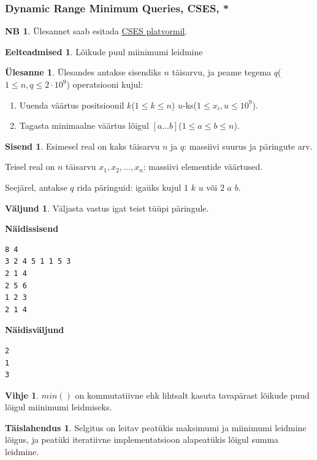 \documentclass{trkut}
\theoremstyle{definition}
\newtheorem*{prereq}{Eelteadmised}
\newtheorem*{extra}{NB}
\newtheorem*{vihje}{Vihje}
\newtheorem*{solution}{Täislahendus}
\newtheorem*{Input}{Sisend}
\newtheorem*{Output}{Väljund}
\newtheorem*{Text}{Ülesanne}
\begin{document}
\subsubsection{Dynamic Range Minimum Queries, CSES, *} 
\begin{extra}
Ülesannet saab esitada \href{https://cses.fi/problemset/task/1649}{CSES platvormil}.
\end{extra}
\begin{prereq}
Lõikude puul miinimumi leidmine
\end{prereq}
\begin{Text}
Ülesandes antakse sisendiks $n$ täisarvu, ja peame tegema $q$($1\le n,q\le 2\cdot10^9$) operatsiooni kujul: 
\begin{enumerate}
    \item Uuenda väärtus positsioonil $k$($1\le k\le n$) $u$-ks($1\le x_i,u\le 10^9$).
    \item Tagasta minimaalne väärtus lõigul $[a...b]$($1\le a\le b\le n$).
\end{enumerate}

\parencite{min}
\end{Text}
\begin{Input}
 Esimesel real on kaks täisarvu $n$ ja $q$: massiivi suurus ja päringute arv.

 Teisel real on $n$ täisarvu $x_1,x_2,...,x_n$: massiivi elementide väärtused.

 Seejärel, antakse $q$ rida päringuid: igaüks kujul $1$ $k$ $u$ või $2$ $a$ $b$.
\end{Input}

\begin{Output}
Väljasta vastus igat teist tüüpi päringule.
\end{Output}

\textbf{Näidissisend
}
\begin{verbatim}
8 4
3 2 4 5 1 1 5 3
2 1 4
2 5 6
1 2 3
2 1 4
\end{verbatim}

\textbf{Näidisväljund}

\begin{verbatim}
2
1
3
\end{verbatim}



\begin{vihje}
$min()$ on kommutatiivne ehk lihtsalt kasuta tavapärast lõikude puud lõigul miinimumi leidmiseks.
\end{vihje}
\begin{solution}
Selgitus on leitav peatükis maksimumi ja miinimumi leidmine lõigus, ja peatüki iteratiivne implementatsioon alapeatükis lõigul summa leidmine.
\end{solution}
\end{document}

